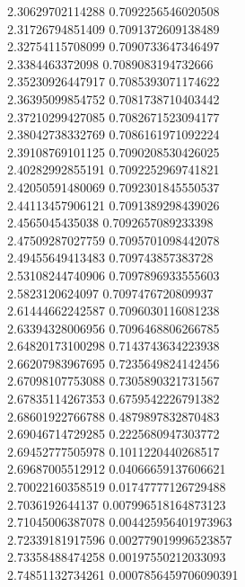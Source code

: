 {2.30629702114288 0.7092256546020508
 \\
2.31726794851409 0.7091372609138489
 \\
2.32754115708099 0.7090733647346497
 \\
2.3384463372098 0.7089083194732666
 \\
2.35230926447917 0.7085393071174622
 \\
2.36395099854752 0.7081738710403442
 \\
2.37210299427085 0.7082671523094177
 \\
2.38042738332769 0.7086161971092224
 \\
2.39108769101125 0.7090208530426025
 \\
2.40282992855191 0.7092252969741821
 \\
2.42050591480069 0.7092301845550537
 \\
2.44113457906121 0.7091389298439026
 \\
2.4565045435038 0.7092657089233398
 \\
2.47509287027759 0.7095701098442078
 \\
2.49455649413483 0.709743857383728
 \\
2.53108244740906 0.7097896933555603
 \\
2.5823120624097 0.7097476720809937
 \\
2.61444662242587 0.7096030116081238
 \\
2.63394328006956 0.7096468806266785
 \\
2.64820173100298 0.7143743634223938
 \\
2.66207983967695 0.7235649824142456
 \\
2.67098107753088 0.7305890321731567
 \\
2.67835114267353 0.6759542226791382
 \\
2.68601922766788 0.4879897832870483
 \\
2.69046714729285 0.2225680947303772
 \\
2.69452777505978 0.1011220440268517
 \\
2.69687005512912 0.04066659137606621
 \\
2.70022160358519 0.01747777126729488
 \\
2.7036192644137 0.007996518164873123
 \\
2.71045006387078 0.004425956401973963
 \\
2.72339181917596 0.002779019996523857
 \\
2.73358488474258 0.00197550212033093
 \\
2.74851132734261 0.0007856459706090391
}
